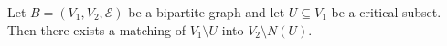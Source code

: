 Let $B = (V_1, V_2, \mathcal{E})$ be a bipartite graph and let $U \subseteq V_1$ be a critical subset. Then there exists a matching of $V_1 \setminus U$ into $V_2 \setminus N(U)$.
